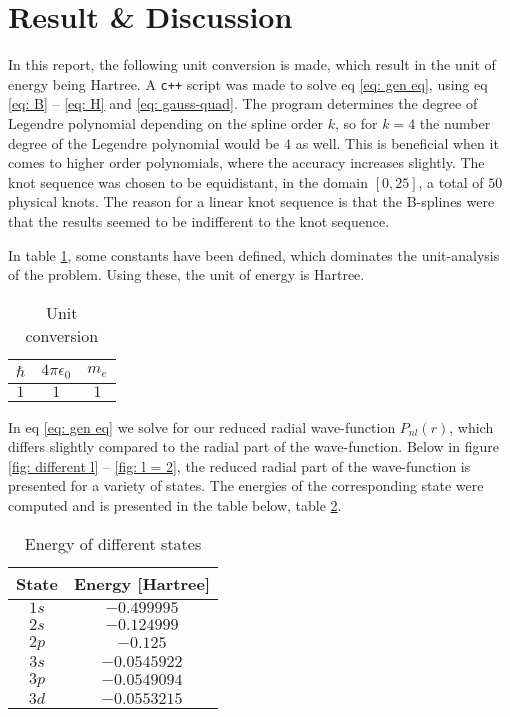 \documentclass[a4paper]{article}
\newcommand{\newparagraph}{\vspace{.5cm}\noindent}
\begin{document}
\section{Result \& Discussion}\label{sec: result}
In this report, the following unit conversion is made, which result in the unit of energy being Hartree.
A \verb|c++| script was made to solve eq \eqref{eq: gen eq}, using eq \eqref{eq: B} -- \eqref{eq: H} and \eqref{eq: gauss-quad}.
The program determines the degree of Legendre polynomial depending on the spline order $k$, so for $k = 4$ the number degree of the Legendre polynomial would be $4$ as well.
This is beneficial when it comes to higher order polynomials, where the accuracy increases slightly.
The knot sequence was chosen to be equidistant, in the domain $[0, 25]$, a total of $50$ physical knots.
The reason for a linear knot sequence is that the B-splines were that the results seemed to be indifferent to the knot sequence. 

\newparagraph
In table \ref{tab: units}, some constants have been defined, which dominates the unit-analysis of the problem. Using these, the unit of energy is Hartree.

\begin{table}[H]
    \centering
    \caption{Unit conversion}
    \begin{tabular}{|c|c|c|}\hline
        $\hbar$ & $4\pi\epsilon_0$ & $m_e$\\\hline
        $1$ & $1$ & $1$\\\hline
    \end{tabular}
    \label{tab: units}
\end{table}\noindent
In eq \eqref{eq: gen eq} we solve for our reduced radial wave-function $P_{nl}(r)$, which differs slightly compared to the radial part of the wave-function.
Below in figure \ref{fig: different l} -- \ref{fig: l = 2}, the reduced radial part of the wave-function is presented for a variety of states.
The energies of the corresponding state were computed and is presented in the table below, table \ref{tab: energies}.
\begin{table}[H]
    \centering
    \caption{Energy of different states}
    \begin{tabular}{|c|c|}\hline
        State & Energy [Hartree] \\\hline
        $1s$ & $-0.499995$\\\hline
        $2s$ & $-0.124999$\\\hline
        $2p$ & $-0.125$ \\\hline
        $3s$ & $-0.0545922$\\\hline
        $3p$ & $-0.0549094$\\\hline
        $3d$ & $-0.0553215$\\\hline 
    \end{tabular}
    \label{tab: energies}
\end{table}\noindent
\end{document}
